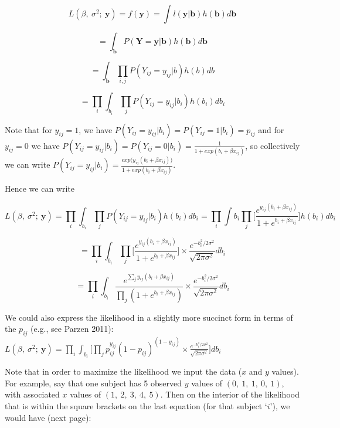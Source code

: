 \documentclass[
  9pt,
  ignorenonframetext,
]{beamer}
\begin{document}
\begin{frame}{}
\protect\hypertarget{section-8}{}
\[
L(\beta,\ \sigma ^2;\ \pmb y)=f(\pmb y)=\int l(\pmb y|\pmb b)h(\pmb b)d\pmb b \]

\vspace{-5mm}

\[ =\int_{\pmb b} P(\pmb Y= \pmb y| \pmb b)h(\pmb b)d\pmb b 
\]

\vspace{-5mm}

\[ 
=\int_{\pmb b}  \prod_{i, j} P(Y_{ij}=y_{ij} |b)h(b)db
\]

\vspace{-5mm}

\[ 
=\prod_i \int_{b_i}\prod_j P(Y_{ij}=y_{ij} |b_i)h(b_i)db_i
\]

Note that for \(y_{ij}=1\), we have
\(P(Y_{ij}=y_{ij} |b_i)=P(Y_{ij}=1|b_i)=p_{ij}\) and for \(y_{ij}=0\) we
have
\(P(Y_{ij}=y_{ij} |b_i)=P(Y_{ij}=0|b_i)=\frac 1 {1 + exp( b_i+\beta x_{ij})}\),
so collectively we can write
\(P(Y_{ij}=y_{ij} |b_i)= \frac {exp\big(y_{ij} (b_i+\beta x_{ij}) \big)} {1+exp(b_i+\beta x_{ij})}\).

Hence we can write

\[
L(\beta,\ \sigma ^2;\ \pmb y) = \prod_i \int_{b_i}\prod_j P(Y_{ij}=y_{ij} |b_i)h(b_i)db_i   =\prod_i \int{b_i}\prod_j \Bigg[ \frac {e^{y_{ij} (b_i+\beta x_{ij})}} {1+e^{b_i+\beta x_{ij}}} \Bigg] h(b_i) db_i 
\]

\vspace{-5mm}

\[
=\prod_i \int_{b_i} \prod_j \Bigg[\frac {e^{y_{ij} (b_i+\beta x_{ij})}} {1+e^{b_i+\beta x_{ij}}}\Bigg] \times \frac {e^{-b_i^2/2\sigma ^2}} {\sqrt{2\pi \sigma ^2 }} db_i  
\]

\vspace{-5mm}

\[
=\prod_i \int_{b_i} \frac {e^{\sum_j y_{ij} (b_i+\beta x_{ij})} } {\prod_j (1+e^{b_i+\beta x_{ij}})} \times \frac {e^{-b_i^2/2\sigma ^2}} {\sqrt{2\pi \sigma ^2 }} db_i
\]
\end{frame}

\begin{frame}{}
\protect\hypertarget{section-9}{}
We could also express the likelihood in a slightly more succinct form in
terms of the \(p_{ij}\) (e.g., see Parzen 2011):
\(L(\beta,\ \sigma ^2;\ \pmb y)=\prod_i \int _{b_i} \Big[ \prod_j p_{ij}^{y_{ij}} (1-p_{ij} )^{(1-y_{ij})} \times \frac {e^{-b_i^2/2\sigma ^2}} {\sqrt{2\pi \sigma ^2 }} \Big] db_i\)

Note that in order to maximize the likelihood we input the data (\(x\)
and \(y\) values). For example, say that one subject has 5 observed
\(y\) values of \((0,\  1,\ 1,\ 0,\ 1)\), with associated \(x\) values
of \((1,\ 2,\ 3,\ 4,\ 5)\). Then on the interior of the likelihood that
is within the square brackets on the last equation (for that subject
`\(i\)'), we would have (next page):
\end{frame}
\end{document}
